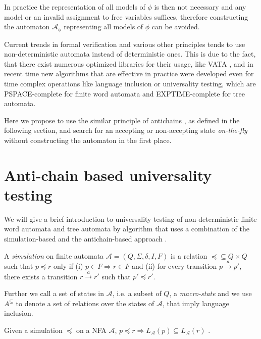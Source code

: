 In practice the representation of all models of $\phi$ is then not necessary and any model or an invalid assignment to free variables suffices, therefore constructing the automaton $\mathcal{A}_{\phi}$ representing all models of $\phi$ can be avoided. 

Current trends in formal verification and various other principles tends to use non-deterministic automata instead of deterministic ones. This is due to the fact, that there exist numerous optimized libraries for their usage, like VATA \cite{vata}, and in recent time new algorithms that are effective in practice were developed even for time complex operations like language inclusion or universality testing, which are PSPACE-complete for finite word automata and EXPTIME-complete for tree automata.  

Here we propose to use the similar principle of antichains \cite{tacas}, as defined in the following section, and search for an accepting or non-accepting state \emph{on-the-fly} without constructing the automaton in the first place.

\section{Anti-chain based universality testing}

We will give a brief introduction to universality testing of non-deterministic finite word automata and tree automata by algorithm that uses a combination of the simulation-based and the antichain-based approach \cite{tacas}.

\begin{defz}
A \emph{simulation} on finite automata $\mathcal{A} = (Q, \Sigma, \delta, I, F)$  is a relation $\preceq \subseteq Q \times Q$ such that $p \preceq r$ only if (i) $p \in F \Rightarrow r \in F$ and (ii) for every transition $p \overset{a}{\longrightarrow} p'$, there exists a transition $r \overset{a}{\longrightarrow} r'$ such that $p' \preceq r'$.
\end{defz}

Further we call a set of states in $\mathcal{A}$, i.e. a subset of $Q$, a \emph{macro-state} and we use $A^{\subseteq}$ to denote a set of relations over the states of $\mathcal{A}$, that imply language inclusion. 

\begin{lemma}
Given a simulation $\preceq$ on a NFA $\mathcal{A}$, $p \preceq r \Rightarrow L_\mathcal{A}(p) \subseteq L_\mathcal{A}(r)$ \cite{tacas}.
\end{lemma}

